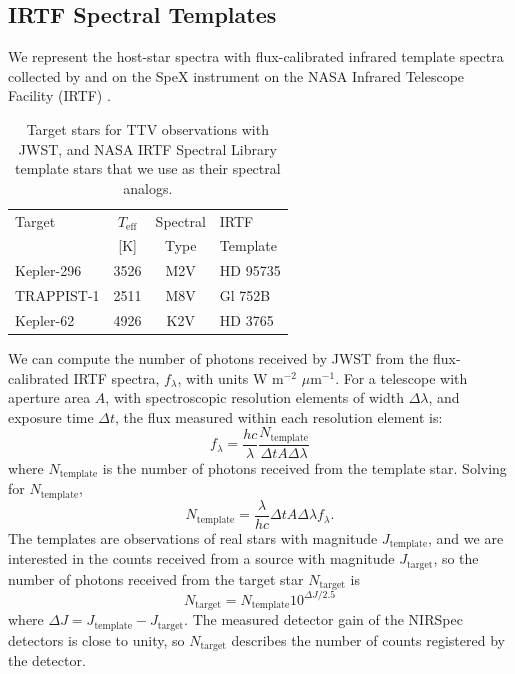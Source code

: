 \subsection{IRTF Spectral Templates}

We represent the host-star spectra with flux-calibrated infrared template spectra collected by \citet{Cushing2005} and \citet{Rayner2009} on the SpeX instrument on the NASA Infrared Telescope Facility (IRTF) \citep{Rayner2003}. 

\begin{table}
\centering
\begin{tabular}{lccl}
Target & $T_{\mathrm{eff}}$ & Spectral & IRTF\\
 & [K] & Type & Template \\ \hline\hline
Kepler-296 & 3526 & M2V & HD 95735 \\
TRAPPIST-1 & 2511 & M8V & Gl 752B\\
Kepler-62 & 4926 & K2V & HD 3765\\
\end{tabular}
\caption{Target stars for TTV observations with JWST, and NASA IRTF Spectral Library template stars that we use as their spectral analogs. \label{tab:temps}}
\end{table}

We can compute the number of photons received by JWST from the flux-calibrated IRTF spectra, $f_\lambda$, with units W m$^{-2}$ $\mu$m$^{-1}$. For a telescope with aperture area $A$, with spectroscopic resolution elements of width $\Delta \lambda$, and exposure time $\Delta t$, the flux measured within each resolution element is: 
\begin{equation}
f_\lambda = \frac{hc}{\lambda} \frac{N_{\mathrm{template}}}{\Delta t A \Delta \lambda}
\end{equation}
where $N_{\mathrm{template}}$ is the number of photons received from the template star. Solving for $N_{\mathrm{template}}$,
\begin{equation}
N_{\mathrm{template}} = \frac{\lambda}{hc} \Delta t A \Delta \lambda f_\lambda.
\end{equation}
The templates are observations of real stars with magnitude $J_{\mathrm{template}}$, and we are interested in the counts received from a source with magnitude $J_{\mathrm{target}}$, so the number of photons received from the target star $N_{\mathrm{target}}$ is
\begin{equation}
N_\mathrm{target} = N_\mathrm{template} 10^{\Delta J / 2.5}
\end{equation}
where $\Delta J=J_\mathrm{template} - J_\mathrm{target}$. The measured detector gain of the NIRSpec detectors is close to unity, so $N_\mathrm{target}$ describes the number of counts registered by the detector. 

